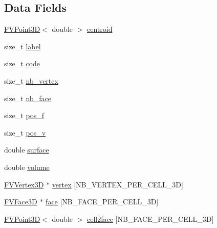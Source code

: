 \subsection*{Data Fields}
\begin{DoxyCompactItemize}
\item 
\hyperlink{classFVPoint3D}{FVPoint3D}$<$ double $>$ \hyperlink{classFVCell3D_af0e77c00d990c1a712cf032be1bb8f0f}{centroid}
\item 
size\_\-t \hyperlink{classFVCell3D_a1ec973463c76e6d9e91160720959ad68}{label}
\item 
size\_\-t \hyperlink{classFVCell3D_acf258c3b3328a96e3ee1e3b875b7874f}{code}
\item 
size\_\-t \hyperlink{classFVCell3D_a0a063e99fbc85e837d93dfbcda6f5252}{nb\_\-vertex}
\item 
size\_\-t \hyperlink{classFVCell3D_acafc91cfd098750db0bcbe840dbb283c}{nb\_\-face}
\item 
size\_\-t \hyperlink{classFVCell3D_a22e92dae91397209d0da1e056358fbd7}{pos\_\-f}
\item 
size\_\-t \hyperlink{classFVCell3D_a9edf0688f0159bed5d3a6828f63146fd}{pos\_\-v}
\item 
double \hyperlink{classFVCell3D_aec4a2e345c6aacee9bb86c610f0bfab6}{surface}
\item 
double \hyperlink{classFVCell3D_a8eb3ef4958b442309868039dbab6f0bf}{volume}
\item 
\hyperlink{classFVVertex3D}{FVVertex3D} $\ast$ \hyperlink{classFVCell3D_a7fe38788ed0792b47203a4fb432f523a}{vertex} \mbox{[}NB\_\-VERTEX\_\-PER\_\-CELL\_\-3D\mbox{]}
\item 
\hyperlink{classFVFace3D}{FVFace3D} $\ast$ \hyperlink{classFVCell3D_a1e22889f938f60a77af81fe2dd8423f9}{face} \mbox{[}NB\_\-FACE\_\-PER\_\-CELL\_\-3D\mbox{]}
\item 
\hyperlink{classFVPoint3D}{FVPoint3D}$<$ double $>$ \hyperlink{classFVCell3D_a13f89e3dcdbe5547a6ef0b92f3bb4583}{cell2face} \mbox{[}NB\_\-FACE\_\-PER\_\-CELL\_\-3D\mbox{]}
\end{DoxyCompactItemize}


